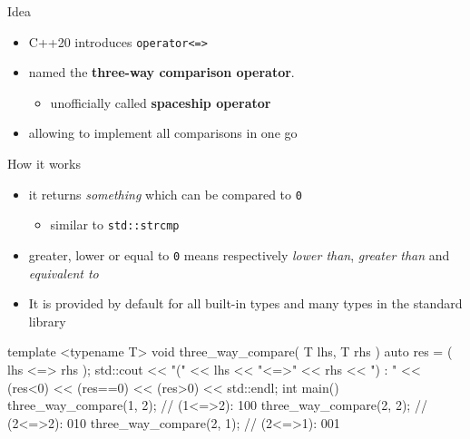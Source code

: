 \begin{frame}[fragile]
  \begin{block}{Idea}
    \begin{itemize}
    \item C++20 introduces \texttt{operator<=>}
    \item named the \textbf{three-way comparison operator}.
      \begin{itemize}
      \item unofficially called \textbf{spaceship operator}
      \end{itemize}
    \item allowing to implement all comparisons in one go
    \end{itemize}
  \end{block}
  \begin{exampleblock}{How it works}
    \begin{itemize}
    \item it returns \emph{something} which can be compared to \texttt{0}
      \begin{itemize}
      \item similar to \texttt{std::strcmp}
      \end{itemize}
    \item greater, lower or equal to \texttt{0} means respectively \emph{lower than}, \emph{greater than} and \emph{equivalent to}
    \item It is provided by default for all built-in types and many types in the standard library
    \end{itemize}
  \end{exampleblock}
\end{frame}

\begin{frame}[fragile]
  \begin{exampleblock}{}
    \begin{cppcode*}{}
    template <typename T>
    void three_way_compare( T lhs, T rhs ) {
      auto res = ( lhs <=> rhs );
      std::cout << "(" << lhs << "<=>" << rhs << ") : "
                << (res<0) << (res==0) << (res>0)
                << std::endl;
    }
    int main() {
      three_way_compare(1, 2); // (1<=>2): 100
      three_way_compare(2, 2); // (2<=>2): 010
      three_way_compare(2, 1); // (2<=>1): 001
    }
    \end{cppcode*}
  \end{exampleblock}
\end{frame}

